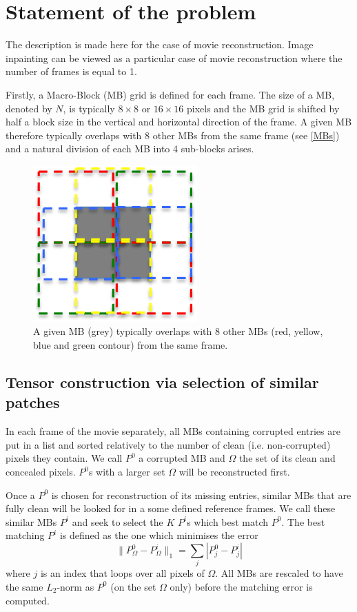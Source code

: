 \documentclass[a4paper, 11pt]{article} %
\def \bee {\begin{equation}}
\def \eee {\end{equation}}
\def \t {\times}
\begin{document}
\section{Statement of the problem}
The description is made here for the case of movie reconstruction. Image inpainting can be viewed as a particular case of movie reconstruction where the number of frames is equal to 1.

Firstly, a Macro-Block (MB) grid is defined for each frame. The size of a MB, denoted by $N$, is typically  $8\t 8$ or $16\t 16$ pixels and the MB grid is shifted by half a block size in the vertical and horizontal direction of the frame. A given MB therefore typically overlaps with 8 other MBs from the same frame (see \autoref{MBs}) and a natural division of each MB into 4 sub-blocks arises. 

\begin{figure}[h!]
\centering
\includegraphics[scale=0.6]{MBs}
\caption{A given MB (grey) typically overlaps with 8 other MBs (red, yellow, blue and green contour) from the same frame.  \label{MBs}}
\end{figure}
\subsection{Tensor construction via selection of similar patches}

In each frame of the movie separately, all MBs containing corrupted entries are put in a list and sorted relatively to the number of clean (i.e. non-corrupted) pixels they contain.
We call $P^0$ a corrupted MB and $\Omega$ the set of its clean and concealed pixels.
$P^0$s with a larger set $\Omega$ will be reconstructed first.

Once a $P^0$ is chosen for reconstruction of its missing entries, similar MBs that are fully clean will be looked for in a some defined reference frames. We call these similar MBs $P^i$ and seek to select the $K$  $P^i$s which best match $P^0$. The best matching $P^i$ is defined as the one which minimises the error
\bee
\| P_{\Omega}^0-P_{\Omega}^i\|_1=\sum \limits_{j} |P^0_j-P^i_j|
\label{ErrorMatching}
\eee
where $j$ is an index that loops over all pixels of $\Omega$. All MBs are rescaled to have the same $L_2$-norm as $P^0$ (on the set $\Omega$ only) before the matching error is computed. 
\end{document}
